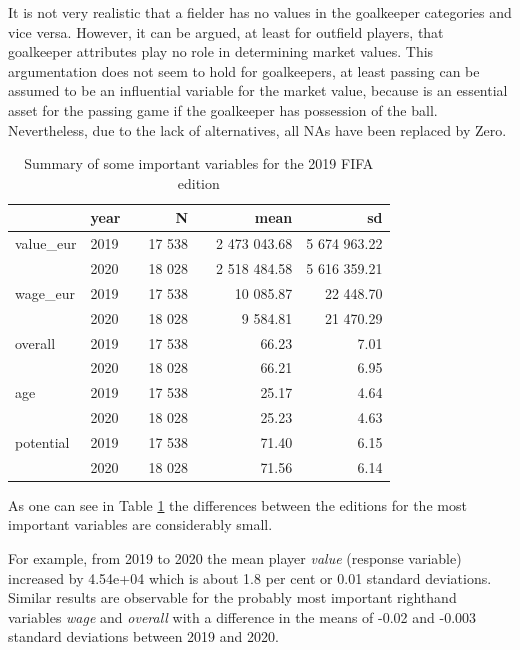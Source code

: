 \documentclass[12pt,a4paper]{article}
\begin{document}
It is not very realistic that a fielder has no values in the goalkeeper
categories and vice versa. However, it can be argued, at least for
outfield players, that goalkeeper attributes play no role in determining
market values. This argumentation does not seem to hold for goalkeepers,
at least passing can be assumed to be an influential variable for the
market value, because is an essential asset for the passing game if the
goalkeeper has possession of the ball. Nevertheless, due to the lack of
alternatives, all NAs have been replaced by Zero.

\begin{table}[!h]

\caption{\label{tab:data}\label{tab:sum} Summary of some important variables for the 2019 FIFA edition}
\centering
\begin{tabular}[t]{lllrlrr}
\toprule
 & year &  & N &   & mean & sd\\
\midrule
\rowcolor{gray!6}  value\_eur & 2019 &  & 17 538 &  & 2 473 043.68 & 5 674 963.22\\
 & 2020 &  & 18 028 &  & 2 518 484.58 & 5 616 359.21\\
\rowcolor{gray!6}  wage\_eur & 2019 &  & 17 538 &  & 10 085.87 & 22 448.70\\
 & 2020 &  & 18 028 &  & 9 584.81 & 21 470.29\\
\rowcolor{gray!6}  overall & 2019 &  & 17 538 &  & 66.23 & 7.01\\
 & 2020 &  & 18 028 &  & 66.21 & 6.95\\
\rowcolor{gray!6}  age & 2019 &  & 17 538 &  & 25.17 & 4.64\\
 & 2020 &  & 18 028 &  & 25.23 & 4.63\\
\rowcolor{gray!6}  potential & 2019 &  & 17 538 &  & 71.40 & 6.15\\
 & 2020 &  & 18 028 &  & 71.56 & 6.14\\
\bottomrule
\end{tabular}
\end{table}

As one can see in Table \ref{tab:sum} the differences between the
editions for the most important variables are considerably small.

For example, from 2019 to 2020 the mean player \emph{value} (response
variable) increased by 4.54e+04 which is about 1.8 per cent or 0.01
standard deviations. Similar results are observable for the probably
most important righthand variables \emph{wage} and \emph{overall} with a
difference in the means of -0.02 and -0.003 standard deviations between
2019 and 2020.
\end{document}

